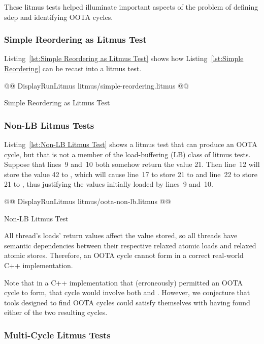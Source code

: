 \documentclass[10]{article}
\begin{document}
These litmus tests helped illuminate important aspects of the problem
of defining sdep and identifying OOTA cycles.

\subsubsection{Simple Reordering as Litmus Test}
\label{app:Simple Reordering as Litmus Test}

Listing~\ref{lst:Simple Reordering as Litmus Test}
shows how
Listing~\ref{lst:Simple Reordering}
can be recast into a  litmus test.

\begin{listing}[tbp]
@@ DisplayRunLitmus litmus/simple-reordering.litmus @@
\caption{Simple Reordering as Litmus Test}
\label{lst:Simple Reordering as Litmus Test}
\end{listing}

\subsubsection{Non-LB Litmus Tests}
\label{app:Non-LB Litmus Tests}

Listing~\ref{lst:Non-LB Litmus Test}
shows a litmus test that can produce an OOTA cycle, but that is not
a member of the load-buffering (LB) class of litmus tests.
Suppose that lines~9 and~10 both somehow return the value 21.
Then line~12 will store the value 42 to , which will cause
line~17 to store 21 to  and line~22 to store 21 to ,
thus justifying the values initially loaded by lines~9 and~10.

\begin{listing}[tbp]
@@ DisplayRunLitmus litmus/oota-non-lb.litmus @@
\caption{Non-LB Litmus Test}
\label{lst:Non-LB Litmus Test}
\end{listing}

All thread's loads' return values affect the value stored, so all
threads have semantic dependencies between their respective relaxed
atomic loads and relaxed atomic stores.
Therefore, an OOTA cycle cannot form in a correct real-world C++
implementation.

Note that in a C++ implementation that (erroneously) permitted an OOTA
cycle to form, that cycle would involve both  and .
However, we conjecture that tools designed to find OOTA cycles could
satisfy themselves with having found either of the two resulting cycles.

\subsubsection{Multi-Cycle Litmus Tests}
\label{app:Multi-Cycle Litmus Tests}
\end{document}
